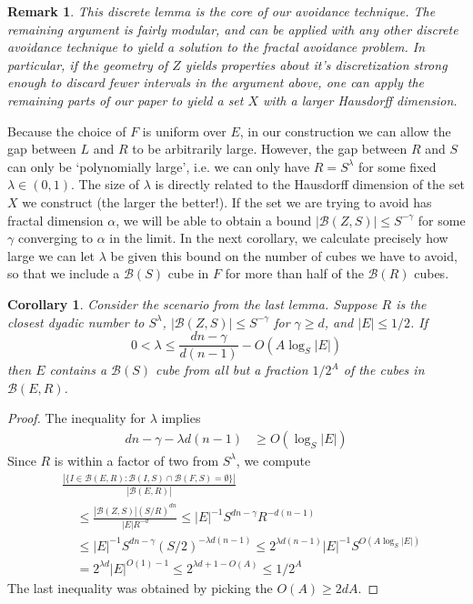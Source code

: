 \documentclass{article}
\theoremstyle{plain}
\newtheorem*{corollary}{Corollary}
\theoremstyle{plain}
\newtheorem*{remark}{Remark}
\begin{document}
\begin{remark}
	This discrete lemma is the core of our avoidance technique. The remaining argument is fairly modular, and can be applied with any other discrete avoidance technique to yield a solution to the fractal avoidance problem. In particular, if the geometry of $Z$ yields properties about it's discretization strong enough to discard fewer intervals in the argument above, one can apply the remaining parts of our paper to yield a set $X$ with a larger Hausdorff dimension.
\end{remark}

Because the choice of $F$ is uniform over $E$, in our construction we can allow the gap between $L$ and $R$ to be arbitrarily large. However, the gap between $R$ and $S$ can only be `polynomially large', i.e. we can only have $R = S^\lambda$ for some fixed $\lambda \in (0,1)$. The size of $\lambda$ is directly related to the Hausdorff dimension of the set $X$ we construct (the larger the better!). If the set we are trying to avoid has fractal dimension $\alpha$, we will be able to obtain a bound $|\mathcal{B}(Z,S)| \leq S^{-\gamma}$ for some $\gamma$ converging to $\alpha$ in the limit. In the next corollary, we calculate precisely how large we can let $\lambda$ be given this bound on the number of cubes we have to avoid, so that we include a $\mathcal{B}(S)$ cube in $F$ for more than half of the $\mathcal{B}(R)$ cubes.

\begin{corollary}
	Consider the scenario from the last lemma. Suppose $R$ is the closest dyadic number to $S^\lambda$, $|\mathcal{B}(Z,S)| \leq S^{-\gamma}$ for $\gamma \geq d$, and $|E| \leq 1/2$. If
	\[ 0 < \lambda \leq \frac{dn - \gamma}{d(n-1)} - O \left( A \log_S |E| \right) \]
	then $E$ contains a $\mathcal{B}(S)$ cube from all but a fraction $1/2^A$ of the cubes in $\mathcal{B}(E,R)$.
\end{corollary}
\begin{proof}
	The inequality for $\lambda$ implies
	\begin{align*}
		dn - \gamma - \lambda d(n-1) &\geq O \left( \log_S |E| \right)%
	\end{align*}
	Since $R$ is within a factor of two from $S^\lambda$, we compute
	\begin{align*}
		&\frac{|\{ I \in \mathcal{B}(E,R): \mathcal{B}(I,S) \cap \mathcal{B}(F,S) = \emptyset \}|}{|\mathcal{B}(E,R)|}\\
		&\ \ \ \ \ \leq \frac{|\mathcal{B}(Z,S)| (S/R)^{dn}}{|E|R^{-d}} \leq |E|^{-1} S^{dn - \gamma} R^{-d(n-1)}\\
		&\ \ \ \ \ \leq |E|^{-1} S^{dn - \gamma} (S/2)^{- \lambda d(n-1)} \leq 2^{\lambda d (n-1)}|E|^{-1} S^{O(A \log_S|E|)}\\
		&\ \ \ \ \ = 2^{\lambda d} |E|^{O(1) - 1} \leq 2^{\lambda d + 1 - O(A)} \leq 1/2^A
	\end{align*}
	The last inequality was obtained by picking the $O(A) \geq 2d A$.
\end{proof}
\end{document}
